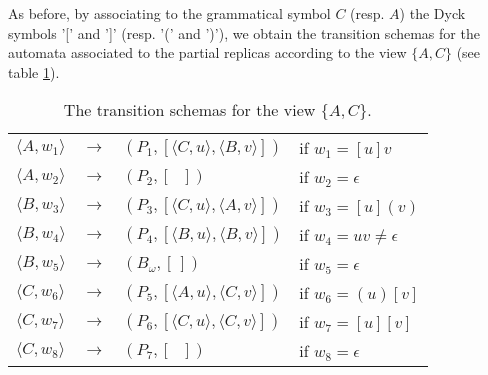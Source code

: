 As before, by associating to the grammatical symbol $C$ (resp. $A$) the Dyck symbols '[' and ']' (resp. '(' and ')'), we obtain the transition schemas for the automata associated to the partial replicas according to the view $\{A, C\}$ (see table \ref{chap2:table:trans-schem-a-c}).
\begin{table}[ht]
	\centering
	\caption{The transition schemas for the view $\{A, C\}$.}
	\label{chap2:table:trans-schem-a-c}
	\begin{tabular}[t]{lcll}
	
	$\langle A,w_{1} \rangle$ & $\longrightarrow$ & $(P_{1}, [\langle C,u \rangle, \langle B,v \rangle])$ & if $w_{1}=[u]v$\\
	
	$\langle A,w_{2} \rangle$ & $\longrightarrow$ & $(P_{2}, [\textit{ }])$ & if $w_{2}=\epsilon$\\
	$\langle B,w_{3} \rangle$ & $\longrightarrow$ & $(P_{3}, [\langle C,u \rangle, \langle A,v \rangle])$ & if $w_{3}=[u](v)$\\
	
	$\langle B,w_{4} \rangle$ & $\longrightarrow$ & $(P_{4}, [\langle B,u \rangle, \langle B,v \rangle])$ & if $w_{4}=uv\neq\epsilon$\\
	$\langle B,w_{5} \rangle$ & $\longrightarrow$ & $(B_\omega,[\,])$ & if $w_{5}=\epsilon$\\
	
	$\langle C,w_{6} \rangle$ & $\longrightarrow$ & $(P_{5}, [\langle A,u \rangle, \langle C,v \rangle])$ & if $w_{6}=(u)[v]$\\
	
	
	$\langle C,w_{7} \rangle$ & $\longrightarrow$ & $(P_{6}, [\langle C,u \rangle, \langle C,v \rangle])$ & if $w_{7}=[u][v]$\\
	
	$\langle C,w_{8} \rangle$ & $\longrightarrow$ & $(P_{7},[\textit{ }])$ & if $w_{8}=\epsilon$\\
	\end{tabular}
\end{table}

